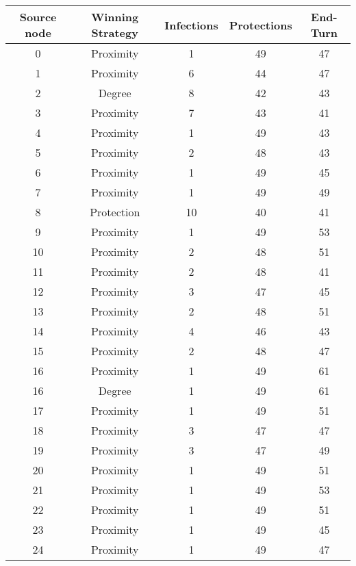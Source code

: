 \documentclass[results.tex]{subfiles}
\begin{document}
\begin{center}
  \begin{tabular}{| c || c | c | c | c |}
    \hline
    {\bfseries Source node} & {\bfseries Winning Strategy} & {\bfseries Infections} & {\bfseries Protections} & {\bfseries End-Turn} \\  %
    \hline\hline
    0 & Proximity & 1 & 49 & 47 \\ 
    \hline
    1 & Proximity & 6 & 44 & 47 \\ 
    \hline
    2 & Degree & 8 & 42 & 43 \\ 
    \hline
    3 & Proximity & 7 & 43 & 41 \\ 
    \hline
    4 & Proximity & 1 & 49 & 43 \\ 
    \hline
    5 & Proximity & 2 & 48 & 43 \\ 
    \hline
    6 & Proximity & 1 & 49 & 45 \\ 
    \hline
    7 & Proximity & 1 & 49 & 49 \\ 
    \hline
    8 & Protection & 10 & 40 & 41 \\ 
    \hline
    9 & Proximity & 1 & 49 & 53 \\ 
    \hline
    10 & Proximity & 2 & 48 & 51 \\ 
    \hline
    11 & Proximity & 2 & 48 & 41 \\ 
    \hline
    12 & Proximity & 3 & 47 & 45 \\ 
    \hline
    13 & Proximity & 2 & 48 & 51 \\ 
    \hline
    14 & Proximity & 4 & 46 & 43 \\ 
    \hline
    15 & Proximity & 2 & 48 & 47 \\ 
    \hline
    16 & Proximity & 1 & 49 & 61 \\ 
    \hline
    16 & Degree & 1 & 49 & 61 \\ 
    \hline
    17 & Proximity & 1 & 49 & 51 \\ 
    \hline
    18 & Proximity & 3 & 47 & 47 \\ 
    \hline
    19 & Proximity & 3 & 47 & 49 \\ 
    \hline
    20 & Proximity & 1 & 49 & 51 \\ 
    \hline
    21 & Proximity & 1 & 49 & 53 \\ 
    \hline
    22 & Proximity & 1 & 49 & 51 \\ 
    \hline
    23 & Proximity & 1 & 49 & 45 \\ 
    \hline
    24 & Proximity & 1 & 49 & 47 \\ 

\end{tabular}
\end{center}
\end{document}
